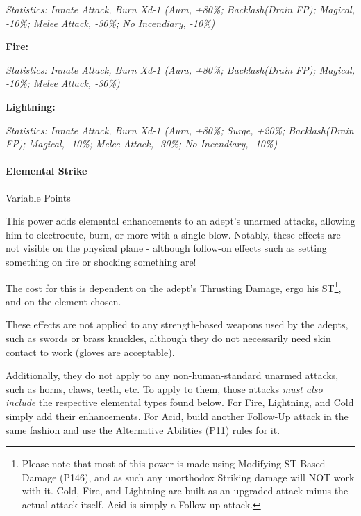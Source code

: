 \begin{multicols}{3}
	\textcolor{OliveGreen}{\textit{Statistics: Innate Attack, Burn Xd-1 (Aura, +80\%; Backlash(Drain FP); Magical, -10\%; Melee Attack, -30\%; No Incendiary, -10\%) }}
	
	\textbf{Fire:}
	
	\textcolor{OliveGreen}{\textit{Statistics: Innate Attack, Burn Xd-1 (Aura, +80\%; Backlash(Drain FP); Magical, -10\%; Melee Attack, -30\%) }}
	
	\textbf{Lightning:}
	
	\textcolor{OliveGreen}{\textit{Statistics: Innate Attack, Burn Xd-1 (Aura, +80\%; Surge, +20\%; Backlash(Drain FP); Magical, -10\%; Melee Attack, -30\%; No Incendiary, -10\%) }}

	\paragraph{Elemental Strike}
	\begin{flushright}
		Variable Points
	\end{flushright}

	This power adds elemental enhancements to an adept's unarmed attacks, allowing him to electrocute, burn, or more with a single blow. Notably, these effects are not visible on the physical plane - although follow-on effects such as setting something on fire or shocking something are!
	
	The cost for this is dependent on the adept's Thrusting Damage, ergo his ST\footnote{Please note that most of this power is made using Modifying ST-Based Damage (P146), and as such any unorthodox Striking damage will NOT work with it. Cold, Fire, and Lightning are built as an upgraded attack minus the actual attack itself. Acid is simply a Follow-up attack.}, and on the element chosen.
	
	These effects are not applied to any strength-based weapons used by the adepts, such as swords or brass knuckles, although they do not necessarily need skin contact to work (gloves are acceptable).
	
	Additionally, they do not apply to any non-human-standard unarmed attacks, such as horns, claws, teeth, etc. To apply to them, those attacks \textit{must also include} the respective elemental types found below. For Fire, Lightning, and Cold simply add their enhancements. For Acid, build another Follow-Up attack in the same fashion and use the Alternative Abilities (P11) rules for it.
	

\end{multicols}
